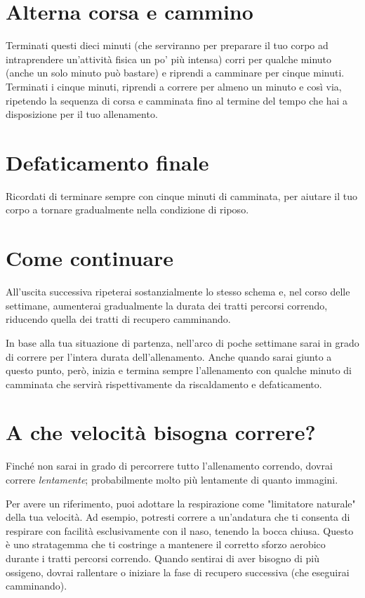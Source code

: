\section*{Alterna corsa e cammino}
Terminati questi dieci minuti (che serviranno per preparare il tuo corpo
ad intraprendere un'attività fisica un po' più intensa)
corri per qualche minuto (anche un solo minuto può
bastare) e riprendi a camminare per cinque minuti.
Terminati i cinque minuti, riprendi a correre per almeno un minuto
e così via, ripetendo la sequenza di corsa e camminata fino al termine
del tempo che hai a disposizione per il tuo allenamento.

\section*{Defaticamento finale}
Ricordati di terminare sempre con cinque minuti di camminata,
per aiutare il tuo corpo a tornare gradualmente nella condizione
di riposo.

\section{Come continuare}
All'uscita successiva ripeterai sostanzialmente lo stesso schema
e, nel corso delle settimane, aumenterai gradualmente la durata dei
tratti percorsi correndo, riducendo quella dei tratti di recupero camminando.

In base alla tua situazione di partenza,
nell'arco di poche settimane sarai in grado di correre per l'intera durata
dell'allenamento.
Anche quando sarai giunto a questo punto, però,
inizia e termina sempre l'allenamento con qualche minuto di camminata
che servirà rispettivamente da riscaldamento e defaticamento.

\section{A che velocità bisogna correre?}

Finché non sarai in grado di percorrere tutto l'allenamento correndo,
dovrai correre \emph{lentamente}; probabilmente molto più lentamente
di quanto immagini.

Per avere un riferimento, puoi adottare la respirazione come
"limitatore naturale" della tua velocità.
Ad esempio, potresti correre a un'andatura che ti consenta
di respirare con facilità esclusivamente con il naso, tenendo la bocca chiusa.
Questo è uno stratagemma che ti costringe a mantenere il corretto
sforzo aerobico durante i tratti percorsi correndo.
Quando sentirai di aver bisogno di più ossigeno,
dovrai rallentare o iniziare la fase di recupero successiva
(che eseguirai camminando).

